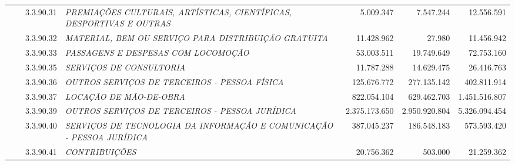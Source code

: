 \documentclass{article}
\begin{document}
\begin{longtable}[c]{m{0.1cm}m{0.1cm}m{0.8cm}|m{8cm}|m{2cm}|m{2cm}|m{2cm}}
\multicolumn{1}{l}{} & \multicolumn{1}{l}{} & \multicolumn{1}{l|}{3.3.90.31} & \multicolumn{1}{L{8cm}|}{\textit{PREMIAÇÕES CULTURAIS, ARTÍSTICAS, CIENTÍFICAS, DESPORTIVAS E OUTRAS}} & \multicolumn{1}{r|}{5.009.347} & \multicolumn{1}{r|}{7.547.244} &  \multicolumn{1}{r}{12.556.591}\\
\multicolumn{1}{l}{} & \multicolumn{1}{l}{} & \multicolumn{1}{l|}{3.3.90.32} & \multicolumn{1}{L{8cm}|}{\textit{MATERIAL, BEM OU SERVIÇO PARA DISTRIBUIÇÃO GRATUITA}} & \multicolumn{1}{r|}{11.428.962} & \multicolumn{1}{r|}{27.980} &  \multicolumn{1}{r}{11.456.942}\\
\multicolumn{1}{l}{} & \multicolumn{1}{l}{} & \multicolumn{1}{l|}{3.3.90.33} & \multicolumn{1}{L{8cm}|}{\textit{PASSAGENS E DESPESAS COM LOCOMOÇÃO}} & \multicolumn{1}{r|}{53.003.511} & \multicolumn{1}{r|}{19.749.649} &  \multicolumn{1}{r}{72.753.160}\\
\multicolumn{1}{l}{} & \multicolumn{1}{l}{} & \multicolumn{1}{l|}{3.3.90.35} & \multicolumn{1}{L{8cm}|}{\textit{SERVIÇOS DE CONSULTORIA}} & \multicolumn{1}{r|}{11.787.288} & \multicolumn{1}{r|}{14.629.475} &  \multicolumn{1}{r}{26.416.763}\\
\multicolumn{1}{l}{} & \multicolumn{1}{l}{} & \multicolumn{1}{l|}{3.3.90.36} & \multicolumn{1}{L{8cm}|}{\textit{OUTROS SERVIÇOS DE TERCEIROS - PESSOA FÍSICA}} & \multicolumn{1}{r|}{125.676.772} & \multicolumn{1}{r|}{277.135.142} &  \multicolumn{1}{r}{402.811.914}\\
\multicolumn{1}{l}{} & \multicolumn{1}{l}{} & \multicolumn{1}{l|}{3.3.90.37} & \multicolumn{1}{L{8cm}|}{\textit{LOCAÇÃO DE MÃO-DE-OBRA}} & \multicolumn{1}{r|}{822.054.104} & \multicolumn{1}{r|}{629.462.703} &  \multicolumn{1}{r}{1.451.516.807}\\
\multicolumn{1}{l}{} & \multicolumn{1}{l}{} & \multicolumn{1}{l|}{3.3.90.39} & \multicolumn{1}{L{8cm}|}{\textit{OUTROS SERVIÇOS DE TERCEIROS - PESSOA JURÍDICA}} & \multicolumn{1}{r|}{2.375.173.650} & \multicolumn{1}{r|}{2.950.920.804} &  \multicolumn{1}{r}{5.326.094.454}\\
\multicolumn{1}{l}{} & \multicolumn{1}{l}{} & \multicolumn{1}{l|}{3.3.90.40} & \multicolumn{1}{L{8cm}|}{\textit{SERVIÇOS DE TECNOLOGIA DA INFORMAÇÃO E COMUNICAÇÃO -  PESSOA JURÍDICA}} & \multicolumn{1}{r|}{387.045.237} & \multicolumn{1}{r|}{186.548.183} &  \multicolumn{1}{r}{573.593.420}\\
\multicolumn{1}{l}{} & \multicolumn{1}{l}{} & \multicolumn{1}{l|}{3.3.90.41} & \multicolumn{1}{L{8cm}|}{\textit{CONTRIBUIÇÕES}} & \multicolumn{1}{r|}{20.756.362} & \multicolumn{1}{r|}{503.000} &  \multicolumn{1}{r}{21.259.362}\\

\end{longtable}
\end{document}
